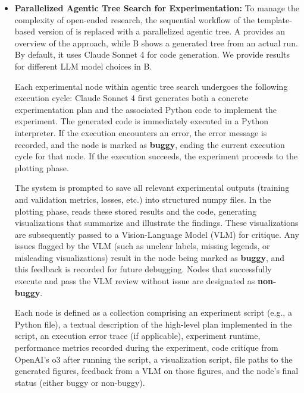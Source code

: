 \begin{itemize}
    \item \textbf{Parallelized Agentic Tree Search for Experimentation:}
    To manage the complexity of open-ended research, the sequential workflow of the template-based version of \ouralgo is replaced with a parallelized agentic tree.
    A provides an overview of the approach, while B shows a generated tree from an actual run.
    By default, it uses Claude Sonnet 4 for code generation. We provide results for different LLM model choices in B.

Each experimental node within agentic tree search undergoes the following execution cycle: Claude Sonnet 4 first generates both a concrete experimentation plan and the associated Python code to implement the experiment. The generated code is immediately executed in a Python interpreter. If the execution encounters an error, the error message is recorded, and the node is marked as \textbf{buggy}, ending the current execution cycle for that node. If the execution succeeds, the experiment proceeds to the plotting phase.

The system is prompted to save all relevant experimental outputs (training and validation metrics, losses, etc.) into structured numpy files. In the plotting phase, \ouralgo reads these stored results and the code, generating visualizations that summarize and illustrate the findings. These visualizations are subsequently passed to a Vision-Language Model (VLM) for critique. Any issues flagged by the VLM (such as unclear labels, missing legends, or misleading visualizations) result in the node being marked as \textbf{buggy}, and this feedback is recorded for future debugging. Nodes that successfully execute and pass the VLM review without issue are designated as \textbf{non-buggy}.

Each node is defined as a collection comprising an experiment script (e.g., a Python file), a textual description of the high-level plan implemented in the script, an execution error trace (if applicable), experiment runtime, performance metrics recorded during the experiment, code critique from OpenAI's o3 after running the script, a visualization script, file paths to the generated figures, feedback from a VLM on those figures, and the node's final status (either buggy or non-buggy).


\end{itemize}
